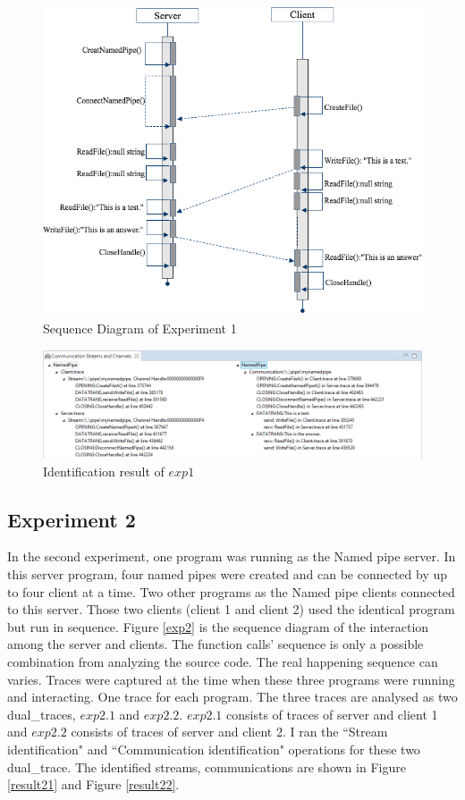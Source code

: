 \begin{figure}[H]
\centerline{\includegraphics[scale=0.7]{Figures/exp1}}
 \caption{Sequence Diagram of Experiment 1}
\label{exp1}
\end{figure}

\begin{figure}[H]
\centerline{\includegraphics[scale=0.65]{Figures/result1}}
 \caption{Identification result of $exp1$}
\label{result1}
\end{figure}

\subsection{Experiment 2}
In the second experiment, one program was running as the Named pipe server. In this server program, four named pipes were created and can be connected by up to four client at a time. Two other programs as the Named pipe clients connected to this server. Those two clients (client 1 and client 2) used the identical program but run in sequence. Figure \ref{exp2} is the sequence diagram of the interaction among the server and clients. The function calls' sequence is only a possible combination from analyzing the source code. The real happening sequence can varies. Traces were captured at the time when these three programs were running and interacting. One trace for each program. The three traces are analysed as two dual\_traces, $exp2.1$ and $exp2.2$. $exp2.1$ consists of traces of server and client 1 and $exp2.2$ consists of traces of server and client 2. I ran the ``Stream identification" and ``Communication identification" operations for these two dual\_trace. The identified streams, communications are shown in Figure \ref{result21} and Figure \ref{result22}.

